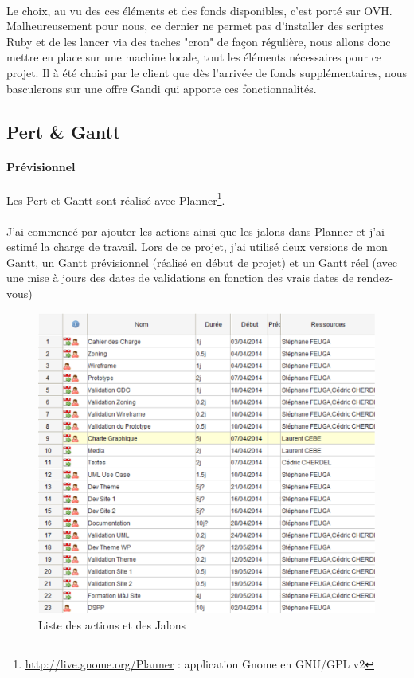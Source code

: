 \documentclass[11pt,a4paper,twoside]{report}
\begin{document}
			\paragraph*{}Le choix, au vu des ces éléments et des fonds disponibles, c'est porté sur OVH. Malheureusement pour nous, ce dernier ne permet pas d'installer des scriptes Ruby et de les lancer via des taches "cron" de façon régulière, nous allons donc mettre en place sur une machine locale, tout les éléments nécessaires pour ce projet. Il à été choisi par le client que dès l'arrivée de fonds supplémentaires, nous basculerons sur une offre Gandi qui apporte ces fonctionnalités.
			\newpage
		\subsection{Pert \& Gantt}
			\paragraph*{Prévisionnel}Les Pert et Gantt sont réalisé avec Planner\footnote{\url{http://live.gnome.org/Planner} : application Gnome en GNU/GPL v2}.
			\paragraph*{}J'ai commencé par ajouter les actions ainsi que les jalons dans Planner et j'ai estimé la charge de travail. Lors de ce projet, j'ai utilisé deux versions de mon Gantt, un Gantt prévisionnel (réalisé en début de projet) et un Gantt réel (avec une mise à jours des dates de validations en fonction des vrais dates de rendez-vous)

				\begin{figure}[H]
					\centering
					\includegraphics[height=10cm]{Gantt_Previsionnel_1.eps}
					\caption{Liste des actions et des Jalons}
					\label{fig:List des Actions Gantt Previsionnel}
				\end{figure}\newpage
\end{document}
